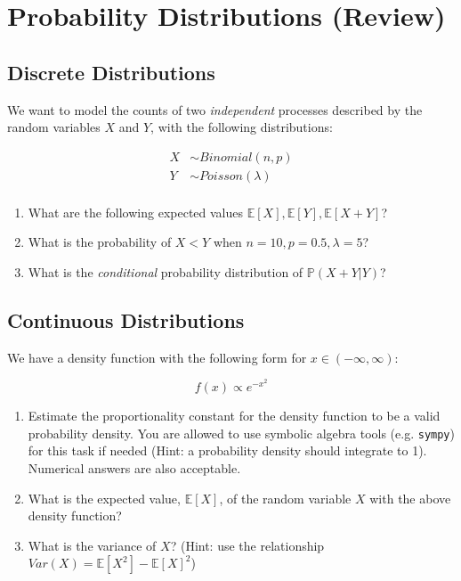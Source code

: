 \documentclass{pset}
\date{7/1/2025}
\begin{document}
\maketitle

\section*{Probability Distributions (Review)}

\subsection*{Discrete Distributions}

We want to model the counts of two \textit{independent} processes described by the random variables $X$ and $Y$, with the following distributions: 

$$
\begin{aligned}
X &\sim Binomial(n,p)\\
Y &\sim Poisson(\lambda)\\ 
\end{aligned}
$$

\begin{enumerate}
\item What are the following expected values $\mathbb{E}[X], \mathbb{E}[Y], \mathbb{E}[X + Y]$?
\item What is the probability of $X < Y$ when $n=10, p=0.5, \lambda=5$? 
\item What is the \textit{conditional} probability distribution of $\mathbb{P}(X + Y | Y)$?
\end{enumerate}

\subsection*{Continuous Distributions}

We have a density function with the following form for $x\in (-\infty, \infty)$: 

$$f(x) \propto e^{-x^2}$$

\begin{enumerate}
\item Estimate the proportionality constant for the density function to be a valid probability density. You are allowed to use symbolic algebra tools (e.g. \texttt{sympy}) for this task if needed (Hint: a probability density should integrate to 1). Numerical answers are also acceptable.
\item What is the expected value, $\mathbb{E}[X]$, of the random variable $X$ with the above density function?
\item What is the variance of $X$? (Hint: use the relationship $Var(X) = \mathbb{E}[X^2] - \mathbb{E}[X]^2$)
\end{enumerate}
\end{document}
